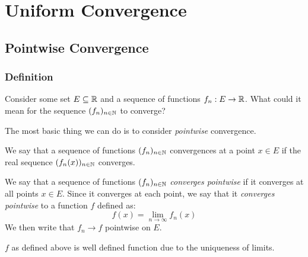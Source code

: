 \documentclass[../main.tex]{subfiles}
\begin{document}
\chapter{Uniform Convergence}
\section{Pointwise Convergence}
\subsection{Definition}
Consider some set $E \subseteq \mathbb{R}$ and a sequence of functions $f_n: E \to \mathbb{R}$.
What could it mean for the sequence $(f_n)_{n \in \mathbb{N}}$ to converge?

The most basic thing we can do is to consider \textit{pointwise} convergence.
\begin{definition}
  We say that a sequence of functions $(f_n)_{n \in \mathbb{N}}$ convergences at a point $x \in E$ if the real sequence $(f_n(x))_{n \in \mathbb{N}}$ converges.
\end{definition}
\begin{definition}
  We say that a sequence of functions $(f_n)_{n \in \mathbb{N}}$ \textit{converges pointwise} if it converges at all points $x \in E$.
  Since it converges at each point, we say that it \textit{converges pointwise} to a function $f$ defined as: \label{pointwiseDef}
  \[
    f(x) = \lim_{n \to \infty} f_n(x)
  \]
  We then write that $f_n \to f$ pointwise on $E$.
\end{definition}
\begin{remark}
  $f$ as defined above is well defined function due to the uniqueness of limits.
\end{remark}
\end{document}
